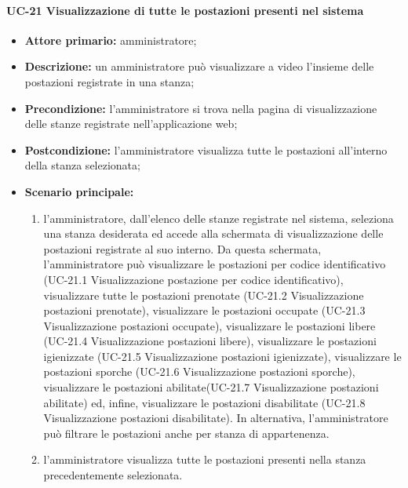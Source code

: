 \paragraph{UC-21 Visualizzazione di tutte le postazioni presenti nel sistema}
\begin{itemize}
    \item \textbf{Attore primario:} amministratore;
    \item \textbf{Descrizione:} un amministratore pu\`{o} visualizzare a video l'insieme delle postazioni registrate in una stanza;
    \item \textbf{Precondizione:} l'amministratore si trova nella pagina di visualizzazione delle stanze registrate nell'applicazione web;
    \item \textbf{Postcondizione:} l'amministratore visualizza tutte le postazioni all'interno della stanza selezionata;
    \item \textbf{Scenario principale:}
    \begin{enumerate}
        \item l'amministratore, dall'elenco delle stanze registrate nel sistema, seleziona una stanza desiderata ed accede alla schermata di visualizzazione delle postazioni registrate al suo interno. Da questa schermata, l'amministratore può visualizzare le postazioni per codice identificativo (UC-21.1 Visualizzazione postazione per codice identificativo), visualizzare tutte le postazioni prenotate (UC-21.2 Visualizzazione postazioni prenotate), visualizzare le postazioni occupate (UC-21.3 Visualizzazione postazioni occupate), visualizzare le postazioni libere (UC-21.4 Visualizzazione postazioni libere), visualizzare le postazioni igienizzate (UC-21.5 Visualizzazione postazioni igienizzate), visualizzare le postazioni sporche (UC-21.6 Visualizzazione postazioni sporche), visualizzare le postazioni abilitate(UC-21.7 Visualizzazione postazioni abilitate) ed, infine, visualizzare le postazioni disabilitate (UC-21.8 Visualizzazione postazioni disabilitate). In alternativa, l'amministratore può filtrare le postazioni anche per stanza di appartenenza.
        \item l'amministratore visualizza tutte le postazioni presenti nella stanza precedentemente selezionata.
    \end{enumerate}
\end{itemize}

